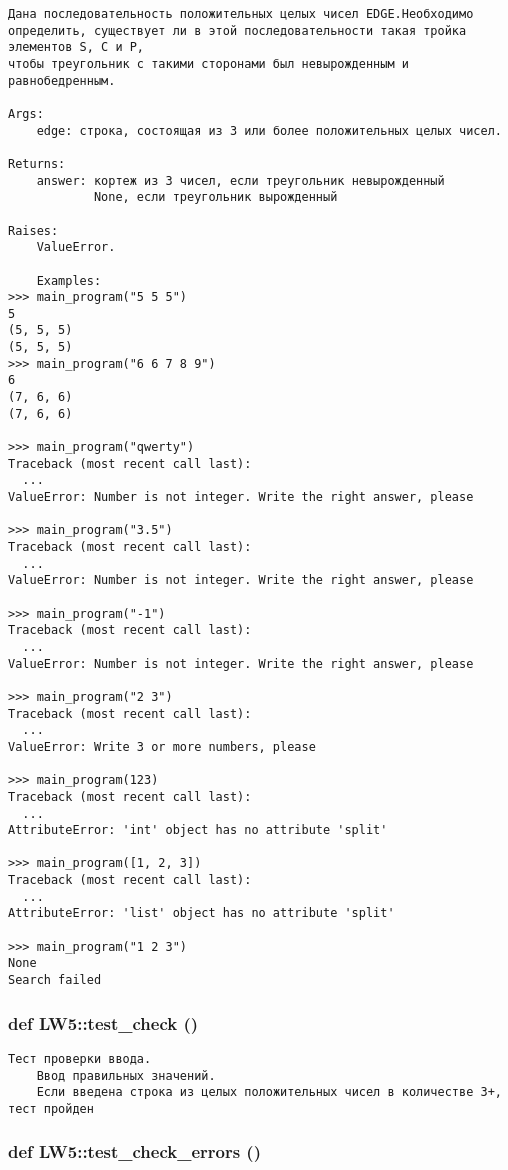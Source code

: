 \footnotesize\begin{verbatim}
Дана последовательность положительных целых чисел EDGE.Необходимо
определить, существует ли в этой последовательности такая тройка элементов S, C и P,
чтобы треугольник с такими сторонами был невырожденным и равнобедренным.

Args:
    edge: строка, состоящая из 3 или более положительных целых чисел.

Returns:
    answer: кортеж из 3 чисел, если треугольник невырожденный
            None, если треугольник вырожденный

Raises:
    ValueError.

    Examples:
>>> main_program("5 5 5")
5
(5, 5, 5)
(5, 5, 5)
>>> main_program("6 6 7 8 9")
6
(7, 6, 6)
(7, 6, 6)

>>> main_program("qwerty")
Traceback (most recent call last):
  ...
ValueError: Number is not integer. Write the right answer, please

>>> main_program("3.5")
Traceback (most recent call last):
  ...
ValueError: Number is not integer. Write the right answer, please

>>> main_program("-1")
Traceback (most recent call last):
  ...
ValueError: Number is not integer. Write the right answer, please

>>> main_program("2 3")
Traceback (most recent call last):
  ...
ValueError: Write 3 or more numbers, please

>>> main_program(123)
Traceback (most recent call last):
  ...
AttributeError: 'int' object has no attribute 'split'

>>> main_program([1, 2, 3])
Traceback (most recent call last):
  ...
AttributeError: 'list' object has no attribute 'split'

>>> main_program("1 2 3")
None
Search failed
\end{verbatim}
\normalsize
 \hypertarget{namespace_l_w5_bd76fa8b0757a185015a19bfb4187ab2}{
\subsubsection[{test\_\-check}]{\setlength{\rightskip}{0pt plus 5cm}def LW5::test\_\-check ()}}
\label{namespace_l_w5_bd76fa8b0757a185015a19bfb4187ab2}




\footnotesize\begin{verbatim}Тест проверки ввода.
    Ввод правильных значений.
    Если введена строка из целых положительных чисел в количестве 3+, тест пройден\end{verbatim}
\normalsize
 \hypertarget{namespace_l_w5_b27c8f4656c69744a648a5e863d447bc}{
\subsubsection[{test\_\-check\_\-errors}]{\setlength{\rightskip}{0pt plus 5cm}def LW5::test\_\-check\_\-errors ()}}
\label{namespace_l_w5_b27c8f4656c69744a648a5e863d447bc}




